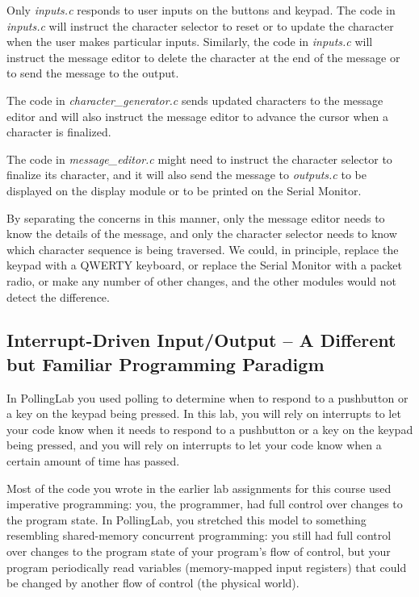 Only \textit{inputs.c} responds to user inputs on the buttons and keypad.
The code in \textit{inputs.c} will instruct the character selector to reset or to update the character when the user makes particular inputs.
Similarly, the code in \textit{inputs.c} will instruct the message editor to delete the character at the end of the message or to send the message to the output.

The code in \textit{character\_generator.c} sends updated characters to the message editor and will also instruct the message editor to advance the cursor when a character is finalized.

The code in \textit{message\_editor.c} might need to instruct the character selector to finalize its character,
and it will also send the message to \textit{outputs.c} to be displayed on the display module or to be printed on the Serial Monitor.

By separating the concerns in this manner, only the message editor needs to know the details of the message,
and only the character selector needs to know which character sequence is being traversed.
We could, in principle, replace the keypad with a QWERTY keyboard, or replace the Serial Monitor with a packet radio, or make any number of other changes, and the other modules would not detect the difference.


\subsection{Interrupt-Driven Input/Output -- A Different but Familiar Programming Paradigm}

In PollingLab you used polling to determine when to respond to a pushbutton or a key on the keypad being pressed.
In this lab, you will rely on interrupts to let your code know when it needs to respond to a pushbutton or a key on the keypad being pressed, and you will rely on interrupts to let your code know when a certain amount of time has passed.

\vspace{.25cm}

Most of the code you wrote in the earlier lab assignments for this course used imperative programming:
you, the programmer, had full control over changes to the program state.
In PollingLab, you stretched this model to something resembling shared-memory concurrent programming:
you still had full control over changes to the program state of your program's flow of control,
but your program periodically read variables (memory-mapped input registers) that could be changed by another flow of control (the physical world).

